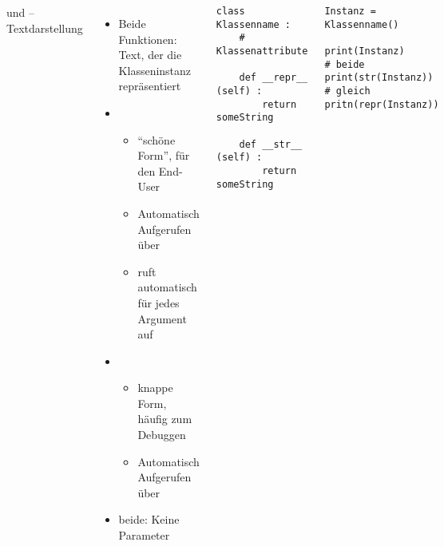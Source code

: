 
\begin{frame}[fragile]
%
\begin{columns}[T]
\begin{Large}
	{ und  -- Textdarstellung}
\end{Large}
\vspace{6pt}
%
\begin{itemize}
\item Beide Funktionen: Text, der die Klasseninstanz repräsentiert
\item {}
	\begin{itemize}
	\item \enquote{schöne Form}, für den End-User
	\item Automatisch Aufgerufen über 
	\item {} ruft automatisch  für jedes Argument auf
	\end{itemize}
\item {}
	\begin{itemize}
	\item knappe Form, häufig zum Debuggen 
	\item Automatisch Aufgerufen über 
	\end{itemize}
\item beide: Keine Parameter
\end{itemize}
%
\begin{codebox}
\begin{verbatim}
class Klassenname :
    # Klassenattribute
    
    def __repr__ (self) :
        return someString
    
    def __str__ (self) :
        return someString
\end{verbatim}
\end{codebox}
%
\begin{codebox}
\begin{verbatim}
Instanz = Klassenname()

print(Instanz)         # beide
print(str(Instanz))    # gleich
pritn(repr(Instanz))
\end{verbatim}
\end{codebox}
\end{columns}
%
\end{frame}


